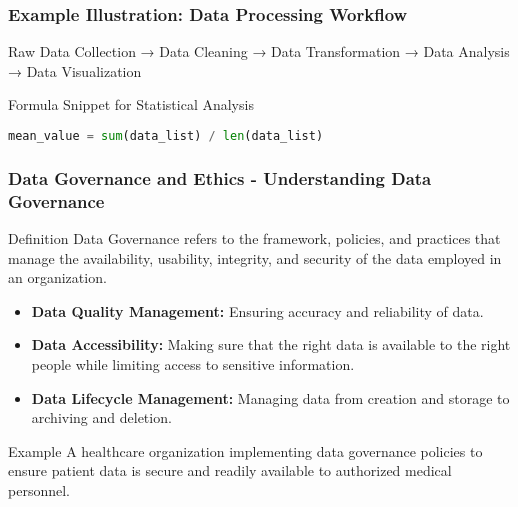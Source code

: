 \documentclass[aspectratio=169]{beamer}
\begin{document}
\begin{frame}[fragile]
    \frametitle{Example Illustration: Data Processing Workflow}
    Raw Data Collection → Data Cleaning → Data Transformation → Data Analysis → Data Visualization
    
    \begin{block}{Formula Snippet for Statistical Analysis}
        \begin{lstlisting}[language=Python]
mean_value = sum(data_list) / len(data_list)
        \end{lstlisting}
    \end{block}
\end{frame}

\begin{frame}[fragile]
    \frametitle{Data Governance and Ethics - Understanding Data Governance}
    
    \begin{block}{Definition}
        Data Governance refers to the framework, policies, and practices that manage the availability, usability, integrity, and security of the data employed in an organization.
    \end{block}
    
    \begin{itemize}
        \item \textbf{Data Quality Management:} Ensuring accuracy and reliability of data.
        \item \textbf{Data Accessibility:} Making sure that the right data is available to the right people while limiting access to sensitive information.
        \item \textbf{Data Lifecycle Management:} Managing data from creation and storage to archiving and deletion.
    \end{itemize}

    \begin{block}{Example}
        A healthcare organization implementing data governance policies to ensure patient data is secure and readily available to authorized medical personnel.
    \end{block}
\end{frame}
\end{document}
